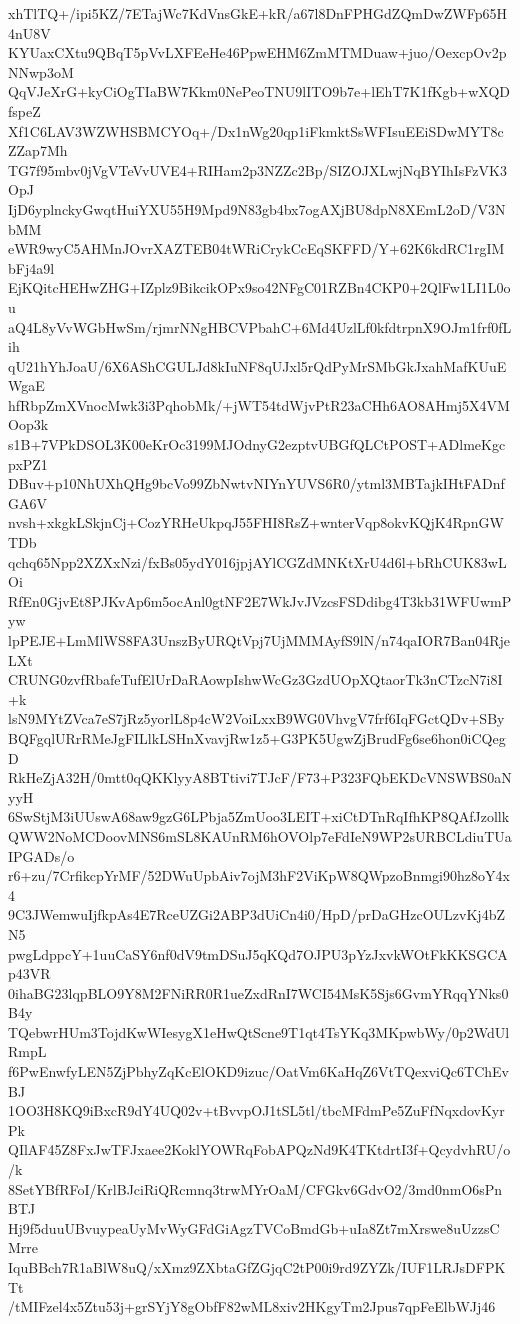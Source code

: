 xhTlTQ+/ipi5KZ/7ETajWc7KdVnsGkE+kR/a67l8DnFPHGdZQmDwZWFp65H4nU8V
KYUaxCXtu9QBqT5pVvLXFEeHe46PpwEHM6ZmMTMDuaw+juo/OexcpOv2pNNwp3oM
QqVJeXrG+kyCiOgTIaBW7Kkm0NePeoTNU9lITO9b7e+lEhT7K1fKgb+wXQDfspeZ
Xf1C6LAV3WZWHSBMCYOq+/Dx1nWg20qp1iFkmktSsWFIsuEEiSDwMYT8cZZap7Mh
TG7f95mbv0jVgVTeVvUVE4+RIHam2p3NZZc2Bp/SIZOJXLwjNqBYIhIsFzVK3OpJ
IjD6yplnckyGwqtHuiYXU55H9Mpd9N83gb4bx7ogAXjBU8dpN8XEmL2oD/V3NbMM
eWR9wyC5AHMnJOvrXAZTEB04tWRiCrykCcEqSKFFD/Y+62K6kdRC1rgIMbFj4a9l
EjKQitcHEHwZHG+IZplz9BikcikOPx9so42NFgC01RZBn4CKP0+2QlFw1LI1L0ou
aQ4L8yVvWGbHwSm/rjmrNNgHBCVPbahC+6Md4UzlLf0kfdtrpnX9OJm1frf0fLih
qU21hYhJoaU/6X6AShCGULJd8kIuNF8qUJxl5rQdPyMrSMbGkJxahMafKUuEWgaE
hfRbpZmXVnocMwk3i3PqhobMk/+jWT54tdWjvPtR23aCHh6AO8AHmj5X4VMOop3k
s1B+7VPkDSOL3K00eKrOc3199MJOdnyG2ezptvUBGfQLCtPOST+ADlmeKgcpxPZ1
DBuv+p10NhUXhQHg9bcVo99ZbNwtvNIYnYUVS6R0/ytml3MBTajkIHtFADnfGA6V
nvsh+xkgkLSkjnCj+CozYRHeUkpqJ55FHI8RsZ+wnterVqp8okvKQjK4RpnGWTDb
qchq65Npp2XZXxNzi/fxBs05ydY016jpjAYlCGZdMNKtXrU4d6l+bRhCUK83wLOi
RfEn0GjvEt8PJKvAp6m5ocAnl0gtNF2E7WkJvJVzcsFSDdibg4T3kb31WFUwmPyw
lpPEJE+LmMlWS8FA3UnszByURQtVpj7UjMMMAyfS9lN/n74qaIOR7Ban04RjeLXt
CRUNG0zvfRbafeTufElUrDaRAowpIshwWcGz3GzdUOpXQtaorTk3nCTzcN7i8I+k
lsN9MYtZVca7eS7jRz5yorlL8p4cW2VoiLxxB9WG0VhvgV7frf6IqFGctQDv+SBy
BQFgqlURrRMeJgFILlkLSHnXvavjRw1z5+G3PK5UgwZjBrudFg6se6hon0iCQegD
RkHeZjA32H/0mtt0qQKKlyyA8BTtivi7TJcF/F73+P323FQbEKDcVNSWBS0aNyyH
6SwStjM3iUUswA68aw9gzG6LPbja5ZmUoo3LEIT+xiCtDTnRqIfhKP8QAfJzollk
QWW2NoMCDoovMNS6mSL8KAUnRM6hOVOlp7eFdIeN9WP2sURBCLdiuTUaIPGADs/o
r6+zu/7CrfikcpYrMF/52DWuUpbAiv7ojM3hF2ViKpW8QWpzoBnmgi90hz8oY4x4
9C3JWemwuIjfkpAs4E7RceUZGi2ABP3dUiCn4i0/HpD/prDaGHzcOULzvKj4bZN5
pwgLdppcY+1uuCaSY6nf0dV9tmDSuJ5qKQd7OJPU3pYzJxvkWOtFkKKSGCAp43VR
0ihaBG23lqpBLO9Y8M2FNiRR0R1ueZxdRnI7WCI54MsK5Sjs6GvmYRqqYNks0B4y
TQebwrHUm3TojdKwWIesygX1eHwQtScne9T1qt4TsYKq3MKpwbWy/0p2WdUlRmpL
f6PwEnwfyLEN5ZjPbhyZqKcElOKD9izuc/OatVm6KaHqZ6VtTQexviQc6TChEvBJ
1OO3H8KQ9iBxcR9dY4UQ02v+tBvvpOJ1tSL5tl/tbcMFdmPe5ZuFfNqxdovKyrPk
QIlAF45Z8FxJwTFJxaee2KoklYOWRqFobAPQzNd9K4TKtdrtI3f+QcydvhRU/o/k
8SetYBfRFoI/KrlBJciRiQRcmnq3trwMYrOaM/CFGkv6GdvO2/3md0nmO6sPnBTJ
Hj9f5duuUBvuypeaUyMvWyGFdGiAgzTVCoBmdGb+uIa8Zt7mXrswe8uUzzsCMrre
IquBBch7R1aBlW8uQ/xXmz9ZXbtaGfZGjqC2tP00i9rd9ZYZk/IUF1LRJsDFPKTt
/tMIFzel4x5Ztu53j+grSYjY8gObfF82wML8xiv2HKgyTm2Jpus7qpFeElbWJj46
